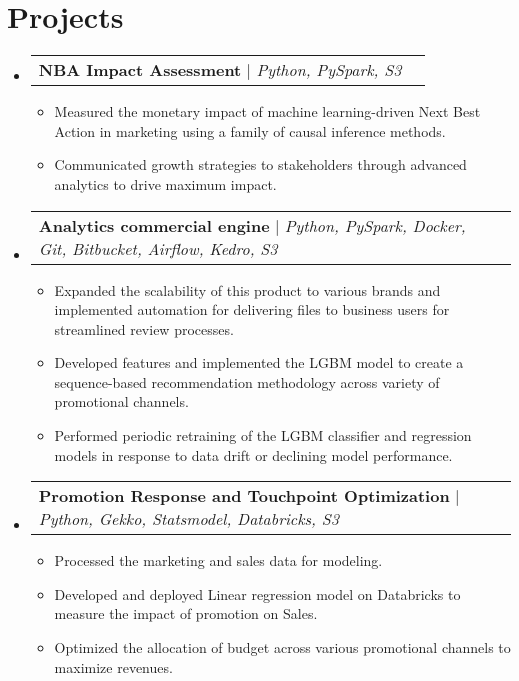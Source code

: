 \documentclass[letterpaper,11pt]{article}
\makeatletter
\newcommand{\resumeItem}[1]{
  \item\small{
    {#1 \vspace{-4pt}}
  }
}
\newcommand{\resumeProjectHeading}[2]{
    \item
    \begin{tabular*}{0.97\textwidth}{l@{\extracolsep{\fill}}r}
      \small#1 & #2 \\
    \end{tabular*}\vspace{-7pt}
}
\newcommand{\resumeSubHeadingListStart}{\begin{itemize}[leftmargin=0.1in, label={}]}
\newcommand{\resumeSubHeadingListEnd}{\end{itemize}}
\newcommand{\resumeItemListStart}{\begin{itemize}}
\newcommand{\resumeItemListEnd}{\end{itemize}\vspace{-1pt}}
\makeatother
\begin{document}
\section{Projects}
    \resumeSubHeadingListStart
      \resumeProjectHeading
          {\textbf{NBA Impact Assessment} $|$ \emph{Python, PySpark, S3}}{}
          \resumeItemListStart
            \resumeItem{Measured the monetary impact of machine learning-driven Next Best Action in marketing using a family of causal inference methods.}
            \resumeItem{Communicated growth strategies to stakeholders through advanced analytics to drive maximum impact.}
          \resumeItemListEnd
          
      \resumeProjectHeading
          {\textbf{Analytics commercial engine} $|$ \emph{Python, PySpark, Docker, Git, Bitbucket, Airflow, Kedro, S3}}{}
          \resumeItemListStart
            \resumeItem{Expanded the scalability of this product to various brands and implemented automation for delivering files to business users for streamlined review processes.}
            \resumeItem{Developed features and implemented the LGBM model to create a sequence-based recommendation methodology across variety of promotional channels.}
            \resumeItem{Performed periodic retraining of the LGBM classifier and regression models in response to data drift or declining model performance.}
          \resumeItemListEnd
          
      \resumeProjectHeading
          {\textbf{Promotion Response and Touchpoint Optimization} $|$ \emph{Python, Gekko, Statsmodel, Databricks, S3}}{}
          \resumeItemListStart
            \resumeItem{Processed the marketing and sales data for modeling.}
            \resumeItem{Developed and deployed Linear regression model on Databricks to measure the impact of promotion on Sales.}
            \resumeItem{Optimized the allocation of budget across various promotional channels to maximize revenues.}
          \resumeItemListEnd
          
    \resumeSubHeadingListEnd



\end{document}
